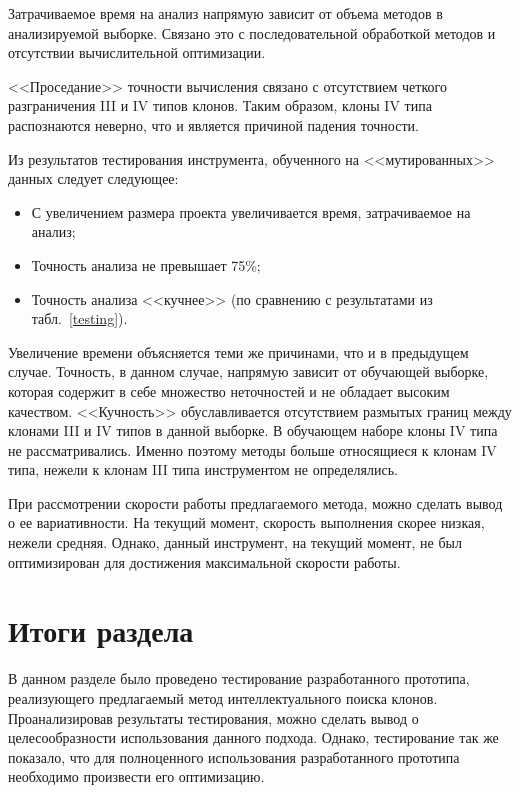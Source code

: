 Затрачиваемое время на анализ напрямую зависит от объема методов в анализируемой выборке. Связано это с последовательной обработкой методов и отсутствии вычислительной оптимизации.

<<Проседание>> точности вычисления связано с отсутствием четкого разграничения III и IV типов клонов. Таким образом, клоны IV типа распознаются неверно, что и является причиной падения точности.

Из результатов тестирования инструмента, обученного на <<мутированных>> данных следует следующее:
\begin{itemize}
\setlength\itemsep{0mm}
\item С увеличением размера проекта увеличивается время, затрачиваемое на анализ;
\item Точность анализа не превышает 75\%;
\item Точность анализа <<кучнее>> (по сравнению с результатами из табл.~\ref{testing}).
\end{itemize}

Увеличение времени объясняется теми же причинами, что и в предыдущем случае. Точность, в данном случае, напрямую зависит от обучающей выборке, которая содержит в себе множество неточностей и не обладает высоким качеством. <<Кучность>> обуславливается отсутствием размытых границ между клонами III и IV типов в данной выборке. В обучающем наборе клоны IV типа не рассматривались. Именно поэтому методы больше относящиеся к клонам IV типа, нежели к клонам III типа инструментом не определялись.

При рассмотрении скорости работы предлагаемого метода, можно сделать вывод о ее вариативности. На текущий момент, скорость выполнения скорее низкая, нежели средняя. Однако, данный инструмент, на текущий момент, не был оптимизирован для достижения максимальной скорости работы. 

\section{Итоги раздела}

В данном разделе было проведено тестирование разработанного прототипа, реализующего предлагаемый метод интеллектуального поиска клонов. Проанализировав результаты тестирования, можно сделать вывод о целесообразности использования данного подхода. Однако, тестирование так же показало, что для полноценного использования разработанного прототипа необходимо произвести его оптимизацию. 


